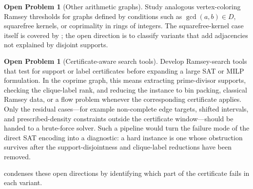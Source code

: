 \documentclass[11pt]{article}
\theoremstyle{plain}
\theoremstyle{definition}
\newtheorem{problem}[theorem]{Open Problem}
\theoremstyle{remark}
\begin{document}
\begin{problem}[Other arithmetic graphs]
Study analogous vertex-coloring Ramsey thresholds for graphs defined by
conditions such as $\gcd(a,b)\in D$, squarefree kernels, or coprimality in
rings of integers.  The squarefree-kernel case itself is covered by
; the open direction is to classify variants that
add adjacencies not explained by disjoint supports.
\end{problem}

\begin{problem}[Certificate-aware search tools]
Develop Ramsey-search tools that test for support or label certificates before
expanding a large SAT or MILP formulation.  In the coprime graph, this means
extracting prime-divisor supports, checking the clique-label rank, and reducing
the instance to bin packing, classical Ramsey data, or a flow problem whenever
the corresponding certificate applies.  Only the residual cases---for example
non-complete edge targets, shifted intervals, and prescribed-density
constraints outside the certificate window---should be handed to a brute-force
solver.  Such a pipeline would turn the failure mode of the direct SAT
encoding into a diagnostic: a hard instance is one whose obstruction survives
after the support-disjointness and clique-label reductions have been removed.
\end{problem}

 condenses these open directions by identifying
which part of the certificate fails in each variant.
\end{document}
